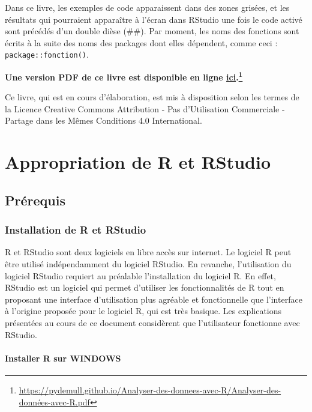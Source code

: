 \documentclass[
]{book}
\begin{document}
Dans ce livre, les exemples de code apparaissent dans des zones grisées, et les résultats qui pourraient apparaître à l'écran dans RStudio une fois le code activé sont précédés d'un double dièse (\#\#). Par moment, les noms des fonctions sont écrits à la suite des noms des packages dont elles dépendent, comme ceci : \texttt{package::fonction()}.

\textbf{Une version PDF de ce livre est disponible en ligne \href{https://pydemull.github.io/Analyser-des-donnees-avec-R/Analyser-des-données-avec-R.pdf}{ici}.\footnote{\url{https://pydemull.github.io/Analyser-des-donnees-avec-R/Analyser-des-données-avec-R.pdf}}}

Ce livre, qui est en cours d'élaboration, est mis à disposition selon les termes de la Licence Creative Commons Attribution - Pas d'Utilisation Commerciale - Partage dans les Mêmes Conditions 4.0 International.

\hypertarget{part-appropriation-de-r-et-rstudio}{%
\part{Appropriation de R et RStudio}\label{part-appropriation-de-r-et-rstudio}}

\hypertarget{pruxe9requis}{%
\chapter{Prérequis}\label{pruxe9requis}}

\hypertarget{installation-de-r-et-rstudio}{%
\section{Installation de R et RStudio}\label{installation-de-r-et-rstudio}}

R et RStudio sont deux logiciels en libre accès sur internet. Le logiciel R peut être utilisé indépendamment du logiciel RStudio. En revanche, l'utilisation du logiciel RStudio requiert au préalable l'installation du logiciel R. En effet, RStudio est un logiciel qui permet d'utiliser les fonctionnalités de R tout en proposant une interface d'utilisation plus agréable et fonctionnelle que l'interface à l'origine proposée pour le logiciel R, qui est très basique. Les explications présentées au cours de ce document considèrent que l'utilisateur fonctionne avec RStudio.

\hypertarget{installer-r-sur-windows}{%
\subsection{Installer R sur WINDOWS}\label{installer-r-sur-windows}}
\end{document}
